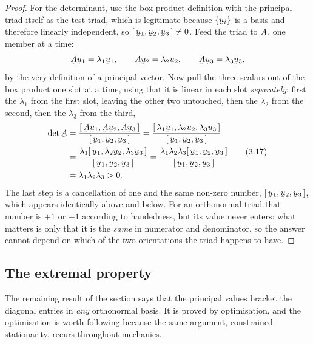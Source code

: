 \begin{proof}
For the determinant, use the box-product definition with the principal
triad itself as the test triad, which is legitimate because $\{\bu_{i}\}$
is a basis and therefore linearly independent, so
$\tbox{\bu_{1}}{\bu_{2}}{\bu_{3}}\neq0$. Feed the triad to $\bA$, one
member at a time:
\[
   \bA\bu_{1}=\lambda_{1}\bu_{1},\qquad
   \bA\bu_{2}=\lambda_{2}\bu_{2},\qquad
   \bA\bu_{3}=\lambda_{3}\bu_{3},
\]
by the very definition of a principal vector. Now pull the three scalars
out of the box product one slot at a time, using that it is linear in each
slot \emph{separately}: first the $\lambda_{1}$ from the first slot,
leaving the other two untouched, then the $\lambda_{2}$ from the second,
then the $\lambda_{3}$ from the third,
\begin{equation}
\begin{aligned}
   \det\bA&=\frac{\tbox{\bA\bu_{1}}{\bA\bu_{2}}{\bA\bu_{3}}}
                 {\tbox{\bu_{1}}{\bu_{2}}{\bu_{3}}}
   =\frac{\tbox{\lambda_{1}\bu_{1}}{\lambda_{2}\bu_{2}}
               {\lambda_{3}\bu_{3}}}{\tbox{\bu_{1}}{\bu_{2}}{\bu_{3}}}\\
   &=\frac{\lambda_{1}\tbox{\bu_{1}}{\lambda_{2}\bu_{2}}
           {\lambda_{3}\bu_{3}}}{\tbox{\bu_{1}}{\bu_{2}}{\bu_{3}}}
   =\frac{\lambda_{1}\lambda_{2}\lambda_{3}
          \tbox{\bu_{1}}{\bu_{2}}{\bu_{3}}}
         {\tbox{\bu_{1}}{\bu_{2}}{\bu_{3}}}\\
   &=\lambda_{1}\lambda_{2}\lambda_{3}>0 .
\end{aligned}
   \tag{3.17}\label{eq:3.17}
\end{equation}
The last step is a cancellation of one and the same non-zero number,
$\tbox{\bu_{1}}{\bu_{2}}{\bu_{3}}$, which appears identically above and
below. For an orthonormal triad that number is $+1$ or $-1$ according to
handedness, but its value never enters: what matters is only that it is the
\emph{same} in numerator and denominator, so the answer cannot depend on
which of the two orientations the triad happens to have.
\end{proof}

\subsection*{The extremal property}

The remaining result of the section says that the principal values bracket
the diagonal entries in \emph{any} orthonormal basis. It is proved by
optimisation, and the optimisation is worth following because the same
argument, constrained stationarity, recurs throughout mechanics.

